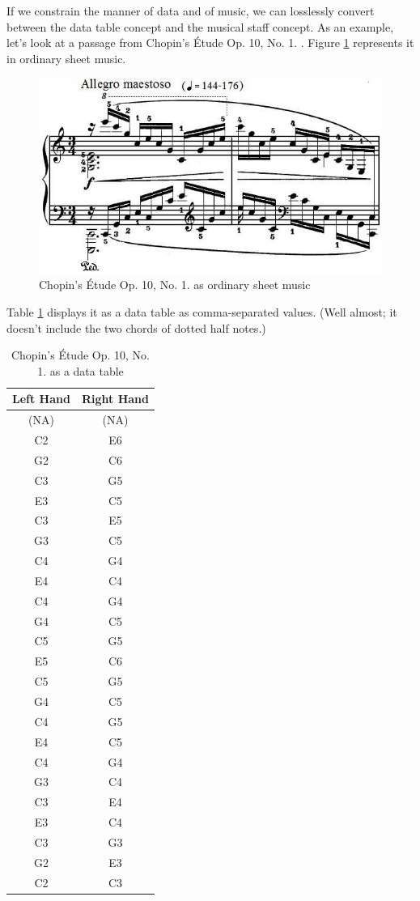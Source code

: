 \documentclass{acm_proc_article-sp}
\begin{document}
If we constrain the manner of data and of music, we can losslessly convert
between the data table concept and the musical staff concept. As an example,
let's look at a passage from Chopin's \'Etude Op. 10, No. 1. \cite{chopin}.
Figure \ref{sheet} represents it in ordinary sheet music.

\begin{figure}
\label{sheet}
\includegraphics[width=\columnwidth]{chopin.png}
\caption{Chopin's \'Etude Op. 10, No. 1. as ordinary sheet music}
\end{figure}

Table \ref{table} displays it as a data table as comma-separated values.
(Well almost; it doesn't include the two chords of dotted half notes.)

\begin{table}
\label{table}
\centering
\begin{tabular}{c c} \hline
Left Hand&Right Hand\\ \hline
   (NA)  &   (NA)\\
    C2   &    E6\\
    G2   &    C6\\
    C3   &    G5\\
    E3   &    C5\\
    C3   &    E5\\
    G3   &    C5\\
    C4   &    G4\\
    E4   &    C4\\
    C4   &    G4\\
    G4   &    C5\\
    C5   &    G5\\
    E5   &    C6\\
    C5   &    G5\\
    G4   &    C5\\
    C4   &    G5\\
    E4   &    C5\\
    C4   &    G4\\
    G3   &    C4\\
    C3   &    E4\\
    E3   &    C4\\
    C3   &    G3\\
    G2   &    E3\\
    C2   &    C3\\ \hline
\end{tabular}
\caption{Chopin's \'Etude Op. 10, No. 1. as a data table}
\end{table}
\end{document}
